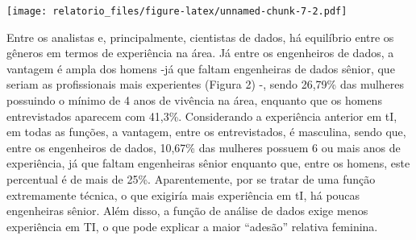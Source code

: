 \documentclass[
]{article}
\begin{document}
\texttt{[image: relatorio\_files/figure-latex/unnamed-chunk-7-2.pdf]}

Entre os analistas e, principalmente, cientistas de dados, há equilíbrio
entre os gêneros em termos de experiência na área. Já entre os
engenheiros de dados, a vantagem é ampla dos homens -já que faltam
engenheiras de dados sênior, que seriam as profissionais mais
experientes (Figura 2) -, sendo 26,79\% das mulheres possuindo o mínimo
de 4 anos de vivência na área, enquanto que os homens entrevistados
aparecem com 41,3\%. Considerando a experiência anterior em tI, em todas
as funções, a vantagem, entre os entrevistados, é masculina, sendo que,
entre os engenheiros de dados, 10,67\% das mulheres possuem 6 ou mais
anos de experiência, já que faltam engenheiras sênior enquanto que,
entre os homens, este percentual é de mais de 25\%. Aparentemente, por
se tratar de uma função extremamente técnica, o que exigiría mais
experiência em tI, há poucas engenheiras sênior. Além disso, a função de
análise de dados exige menos experiência em TI, o que pode explicar a
maior ``adesão'' relativa feminina.
\end{document}
